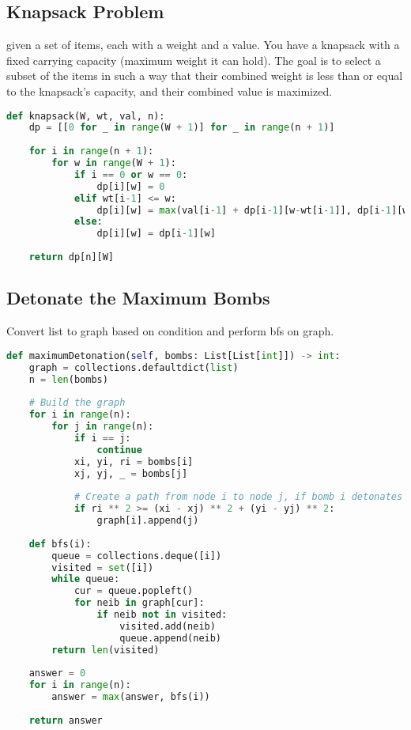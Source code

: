 \documentclass[english, threecolumn]{latex4ei/latex4ei_sheet}
\begin{document}
\begin{sectionbox}
\subsection{Knapsack Problem}
given a set of items, each with a weight and a value. You have a knapsack with a fixed carrying capacity (maximum weight it can hold). The goal is to select a subset of the items in such a way that their combined weight is less than or equal to the knapsack's capacity, and their combined value is maximized.
\begin{lstlisting}[language=python, gobble=0]
def knapsack(W, wt, val, n):
    dp = [[0 for _ in range(W + 1)] for _ in range(n + 1)]
    
    for i in range(n + 1):
        for w in range(W + 1):
            if i == 0 or w == 0:
                dp[i][w] = 0
            elif wt[i-1] <= w:
                dp[i][w] = max(val[i-1] + dp[i-1][w-wt[i-1]], dp[i-1][w])
            else:
                dp[i][w] = dp[i-1][w]
                
    return dp[n][W]
\end{lstlisting}
\end{sectionbox}

\begin{sectionbox}
\subsection{Detonate the Maximum Bombs}
Convert list to graph based on condition and perform bfs on graph.

\begin{lstlisting}[language=python, gobble=0]
def maximumDetonation(self, bombs: List[List[int]]) -> int:
    graph = collections.defaultdict(list)
    n = len(bombs)
    
    # Build the graph
    for i in range(n):
        for j in range(n):
            if i == j:
                continue
            xi, yi, ri = bombs[i]
            xj, yj, _ = bombs[j]
            
            # Create a path from node i to node j, if bomb i detonates bomb j.
            if ri ** 2 >= (xi - xj) ** 2 + (yi - yj) ** 2:
                graph[i].append(j)
    
    def bfs(i):
        queue = collections.deque([i])
        visited = set([i])
        while queue:
            cur = queue.popleft()
            for neib in graph[cur]:
                if neib not in visited:
                    visited.add(neib)
                    queue.append(neib)
        return len(visited)
    
    answer = 0
    for i in range(n):
        answer = max(answer, bfs(i))
    
    return answer
\end{lstlisting}
\end{sectionbox}
\end{document}
